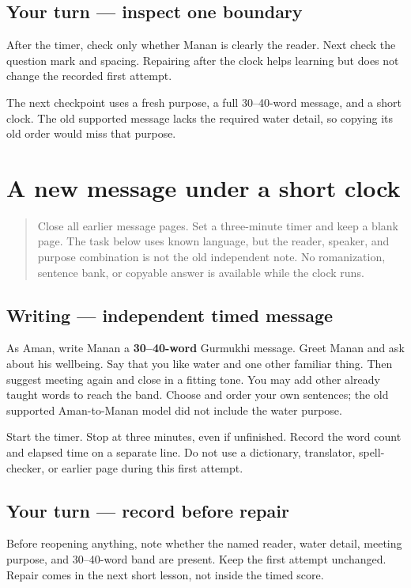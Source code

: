 \subsection*{Your turn — inspect one boundary}
After the timer, check only whether Manan is clearly the reader. Next check the question mark and spacing. Repairing after the clock helps learning but does not change the recorded first attempt.

\begin{tcolorbox}[breakable,colback=teal!4,colframe=teal!35!black,title={Before you move on}]
The next checkpoint uses a fresh purpose, a full 30–40-word message, and a short clock. The old supported message lacks the required water detail, so copying its old order would miss that purpose.
\end{tcolorbox}
\section[(timed independent named-reader message)]{A new message under a short clock}

\label{lesson:PA-W13-message-timed}



\begin{quote}
Close all earlier message pages. Set a three-minute timer and keep a blank page. The task below uses known language, but the reader, speaker, and purpose combination is not the old independent note. No romanization, sentence bank, or copyable answer is available while the clock runs.
\end{quote}

\subsection*{Writing — independent timed message}
As Aman, write Manan a \textbf{30–40-word} Gurmukhi message. Greet Manan and ask about his wellbeing. Say that you like water and one other familiar thing. Then suggest meeting again and close in a fitting tone. You may add other already taught words to reach the band. Choose and order your own sentences; the old supported Aman-to-Manan model did not include the water purpose.

Start the timer. Stop at three minutes, even if unfinished. Record the word count and elapsed time on a separate line. Do not use a dictionary, translator, spell-checker, or earlier page during this first attempt.

\subsection*{Your turn — record before repair}
Before reopening anything, note whether the named reader, water detail, meeting purpose, and 30–40-word band are present. Keep the first attempt unchanged. Repair comes in the next short lesson, not inside the timed score.

